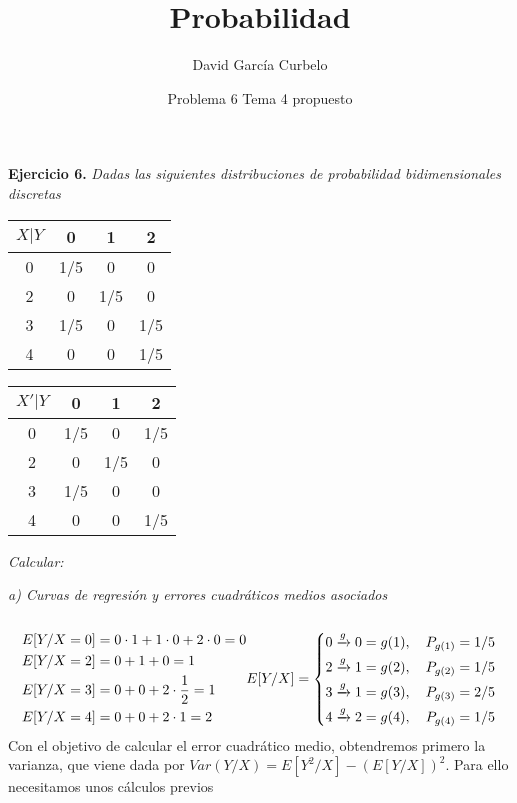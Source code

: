\documentclass[fleqn]{article}
\author{David García Curbelo}
\title{Probabilidad}
\date{Problema 6 Tema 4 propuesto}
\begin{document}
    \maketitle
    \setcounter{page}{1}
    \pagestyle{plain}

    \textbf{Ejercicio 6. } \textit{Dadas las siguientes distribuciones de probabilidad bidimensionales discretas}\\

    \begin{tabular}{|c|c c c|}
        \hline 
        $X|Y$ & 0 & 1 & 2  \\ \hline
        0 & 1/5 & 0 & 0\\
        2 & 0 & 1/5 & 0\\
        3 & 1/5 & 0 & 1/5\\
        4 & 0 & 0 & 1/5\\
        \hline
    \end{tabular}
    \begin{tabular}{|c|c c c|}
        \hline 
        $X'|Y$ & 0 & 1 & 2  \\ \hline
        0 & 1/5 & 0 & 1/5\\
        2 & 0 & 1/5 & 0\\
        3 & 1/5 & 0 & 0\\
        4 & 0 & 0 & 1/5\\
        \hline
    \end{tabular}

    \textit{Calcular:}

    \textit{a) Curvas de regresión y errores cuadráticos medios asociados}\\
    \\
    \begin{equation*}
        \begin{aligned}
            &E[Y/X=0] = 0\cdot 1 + 1\cdot 0 + 2\cdot 0 = 0\\
            &E[Y/X=2] = 0+ 1 + 0 = 1\\
            &E[Y/X=3] = 0 + 0 + 2\cdot\frac{1}{2} = 1\\
            &E[Y/X=4] = 0 + 0 + 2\cdot 1 = 2\\
        \end{aligned}\\
        E[Y/X]= \left\{
        \begin{aligned}
            &0 \xrightarrow{g} 0 = g(1), \quad P_{g(1)} = 1/5 \\
            &2 \xrightarrow{g} 1 = g(2), \quad P_{g(2)} = 1/5 \\
            &3 \xrightarrow{g} 1 = g(3), \quad P_{g(3)} = 2/5 \\
            &4 \xrightarrow{g} 2 = g(4), \quad P_{g(4)} = 1/5 \\
        \end{aligned}
        \right.
    \end{equation*}
    Con el objetivo de calcular el error cuadrático medio, obtendremos primero la varianza, que viene dada por 
    $Var(Y/X)=E[Y^2/X] - \left(E[Y/X]\right)^2$. Para ello necesitamos unos cálculos previos
\end{document}
